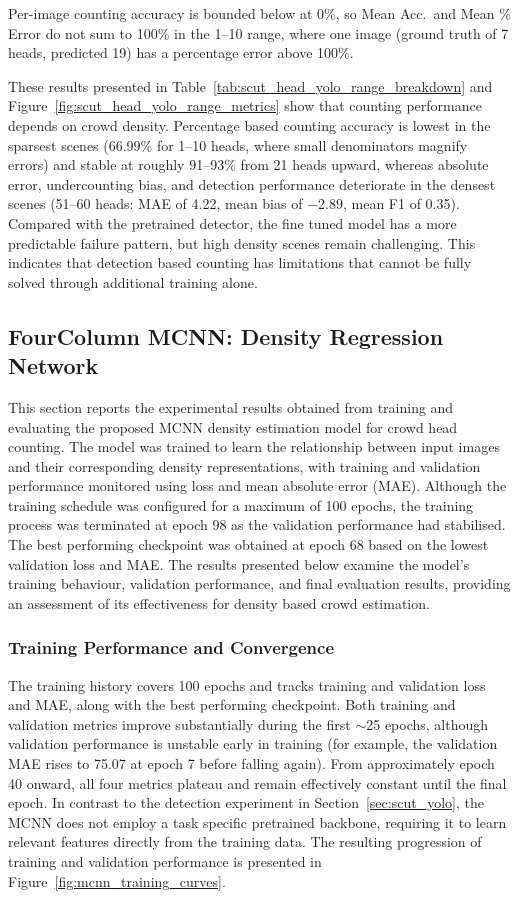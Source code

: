 \documentclass[12pt,a4paper]{report}
\begin{document}
Per-image counting accuracy is bounded below at 0\%, so Mean Acc.\ and Mean \% Error do not sum to 100\% in the 1--10 range, where one image (ground truth of 7 heads, predicted 19) has a percentage error above 100\%.

These results presented in Table~\ref{tab:scut_head_yolo_range_breakdown} and Figure~\ref{fig:scut_head_yolo_range_metrics} show that counting performance depends on crowd density. Percentage based counting accuracy is lowest in the sparsest scenes (66.99\% for 1--10 heads, where small denominators magnify errors) and stable at roughly 91--93\% from 21 heads upward, whereas absolute error, undercounting bias, and detection performance deteriorate in the densest scenes (51--60 heads: MAE of 4.22, mean bias of $-2.89$, mean F1 of 0.35). Compared with the pretrained detector, the fine tuned model has a more predictable failure pattern, but high density scenes remain challenging. This indicates that detection based counting has limitations that cannot be fully solved through additional training alone.

\subsection{FourColumn MCNN: Density Regression Network}
\label{sec:mcnn}

This section reports the experimental results obtained from training and evaluating the proposed MCNN density estimation model for crowd head counting. The model was trained to learn the relationship between input images and their corresponding density representations, with training and validation performance monitored using loss and mean absolute error (MAE). Although the training schedule was configured for a maximum of 100 epochs, the training process was terminated at epoch 98 as the validation performance had stabilised. The best performing checkpoint was obtained at epoch 68 based on the lowest validation loss and MAE. The results presented below examine the model's training behaviour, validation performance, and final evaluation results, providing an assessment of its effectiveness for density based crowd estimation.

\subsubsection{Training Performance and Convergence}

The training history covers 100 epochs and tracks training and validation loss and MAE, along with the best performing checkpoint. Both training and validation metrics improve substantially during the first $\sim$25 epochs, although validation performance is unstable early in training (for example, the validation MAE rises to 75.07 at epoch 7 before falling again). From approximately epoch 40 onward, all four metrics plateau and remain effectively constant until the final epoch. In contrast to the detection experiment in Section~\ref{sec:scut_yolo}, the MCNN does not employ a task specific pretrained backbone, requiring it to learn relevant features directly from the training data. The resulting progression of training and validation performance is presented in Figure~\ref{fig:mcnn_training_curves}.
\end{document}
